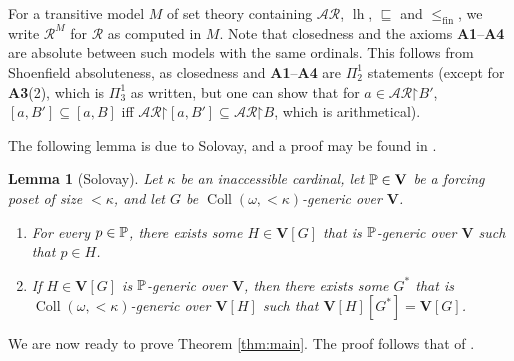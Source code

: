 \documentclass[11pt,reqno]{amsart}
\theoremstyle{plain}
\numberwithin{equation}{section}
\newtheorem{lemma}[theorem]{Lemma}
\theoremstyle{definition}
\newcommand{\func}{\operatorname}
\newcommand{\cal}{\mathcal}
\renewcommand{\bf}{\mathbf}
\newcommand{\restrictedto}{\mathord{\upharpoonright}}
\newcommand{\Coll}{\func{Coll}}
\newcommand{\V}{\bf{V}}
\newcommand{\lh}{\func{lh}}
\newcommand{\fin}{\mathrm{fin}}
\DeclareRobustCommand{\P}{\ifmmode\mathbb{P}\else\pilcrowP\fi}
\begin{document}
For a transitive model $M$ of set theory containing $\cal{AR}$, $\lh$, $\sqsubseteq$ and $\leq_\fin$, we write $\cal{R}^M$ for $\cal{R}$ as computed in $M$. Note that closedness and the axioms \textbf{A1}--\textbf{A4} are absolute between such models with the same ordinals. This follows from Shoenfield absoluteness, as closedness and \textbf{A1}--\textbf{A4} are $\Pi_2^1$ statements (except for \textbf{A3}(2), which is $\Pi_3^1$ as written, but one can show that for $a \in \cal{AR}\restrictedto B'$, $[a,B'] \subseteq [a,B]$ iff $\cal{AR}\restrictedto[a,B'] \subseteq \cal{AR}\restrictedto B$, which is arithmetical).

The following lemma is due to Solovay, and a proof may be found in \cite{Sol70}.

\begin{lemma}[Solovay]
\label{lem:Solovay}
    Let $\kappa$ be an inaccessible cardinal, let $\P \in \V$ be a forcing poset of size $<\kappa$, and let $G$ be $\Coll(\omega,{<}\kappa)$-generic over $\V$.
    \begin{enumerate}
        \item For every $p \in \P$, there exists some $H \in \V[G]$ that is $\P$-generic over $\V$ such that $p \in H$.

        \item If $H \in \V[G]$ is $\P$-generic over $\V$, then there exists some $G^*$ that is $\Coll(\omega,{<}\kappa)$-generic over $\V[H]$ such that $\V[H][G^*] = \V[G]$.
    \end{enumerate}
\end{lemma}

We are now ready to prove Theorem \ref{thm:main}. The proof follows that of \cite[Theorem 1.7]{Y25}.
\end{document}
